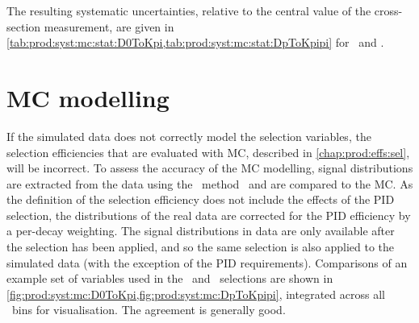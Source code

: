 The resulting systematic uncertainties, relative to the central value of the 
cross-section measurement, are given in 
\cref{tab:prod:syst:mc:stat:D0ToKpi,tab:prod:syst:mc:stat:DpToKpipi} for 
\DzToKpi\ and \DpToKpipi.

\section{\acl{MC} modelling}
\label{chap:prod:syst:mc}

If the simulated data does not correctly model the selection variables, the 
selection efficiencies that are evaluated with \ac{MC}, described in 
\cref{chap:prod:effs:sel}, will be incorrect.
To assess the accuracy of the \acl{MC} modelling, signal distributions are 
extracted from the data using the \sPlot\ method~\cite{Pivk:2004ty} and are 
compared to the \ac{MC}.
As the definition of the selection efficiency does not include the effects of 
the \ac{PID} selection, the distributions of the real data are corrected for 
the \ac{PID} efficiency by a per-decay weighting.
The signal distributions in data are only available after the selection has 
been applied, and so the same selection is also applied to the simulated data 
(with the exception of the \ac{PID} requirements).
Comparisons of an example set of variables used in the \DzToKpi\ and 
\DpToKpipi\ selections are shown in 
\cref{fig:prod:syst:mc:D0ToKpi,fig:prod:syst:mc:DpToKpipi}, integrated across 
all \pTy\ bins for visualisation.
The agreement is generally good.

